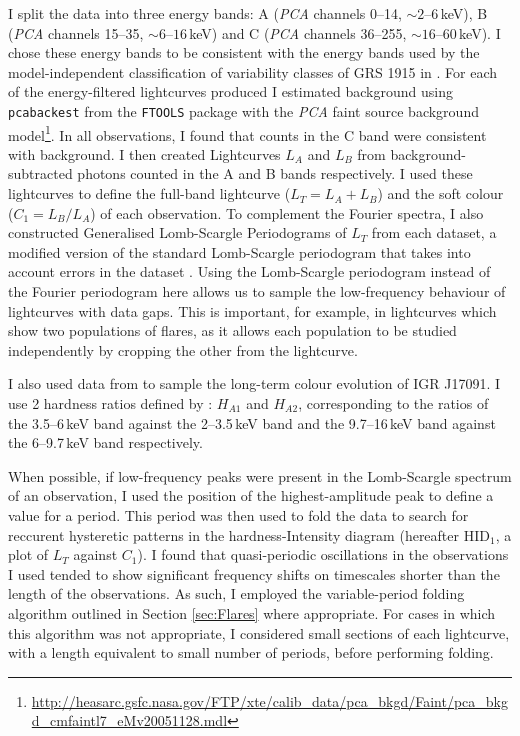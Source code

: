 \par I split the data into three energy bands: A (\textit{PCA} channels 0--14, $\sim2$--$6$\,keV), B (\textit{PCA} channels 15--35, $\sim6$--$16$\,keV) and C (\textit{PCA} channels 36--255, $\sim16$--$60$\,keV).  I chose these energy bands to be consistent with the energy bands used by the model-independent classification of variability classes of GRS 1915 in \citet{Belloni_GRS_MI}.  For each of the energy-filtered lightcurves produced I estimated background using \texttt{pcabackest} from the \texttt{FTOOLS} package \citep{Blackburn_FTools} with the \textit{PCA} faint source background model\footnote{\url{http://heasarc.gsfc.nasa.gov/FTP/xte/calib\_data/pca\_bkgd/Faint/pca\_bkgd\_cmfaintl7\_eMv20051128.mdl}}. In all observations, I found that counts in the C band were consistent with background.  I then created Lightcurves $L_A$ and $L_B$ from background-subtracted photons counted in the A and B bands respectively.  I used these lightcurves to define the full-band lightcurve ($L_T=L_A+L_B$) and the soft colour ($C_1=L_B/L_A$) of each observation.  To complement the Fourier spectra, I also constructed Generalised Lomb-Scargle Periodograms of $L_T$ from each dataset, a modified version of the standard Lomb-Scargle periodogram \citep{Lomb_LombScargle, Scargle_LombScargle} that takes into account errors in the dataset \citep{Irwin_LombScargle}.  Using the Lomb-Scargle periodogram instead of the Fourier periodogram here allows us to sample the low-frequency behaviour of lightcurves with data gaps.  This is important, for example, in lightcurves which show two populations of flares, as it allows each population to be studied independently by cropping the other from the lightcurve.
\par I also used data from \citealt{Altamirano_IGR_FH} to sample the long-term colour evolution of IGR J17091.  I use 2 hardness ratios defined by \citeauthor{Altamirano_IGR_FH}: $H_{A1}$ and $H_{A2}$, corresponding to the ratios of the 3.5--6\,keV band against the 2--3.5\,keV band and the 9.7--16\,keV band against the 6--9.7\,keV band respectively.
\par When possible, if low-frequency peaks were present in the Lomb-Scargle spectrum of an observation, I used the position of the highest-amplitude peak to define a value for a period.  This period was then used to fold the data to search for reccurent hysteretic patterns in the hardness-Intensity diagram (hereafter HID$_1$, a plot of $L_T$ against $C_1$).  I found that quasi-periodic oscillations in the observations I used tended to show significant frequency shifts on timescales shorter than the length of the observations.  As such, I employed the variable-period folding algorithm outlined in Section \ref{sec:Flares} where appropriate.  For cases in which this algorithm was not appropriate, I considered small sections of each lightcurve, with a length equivalent to small number of periods, before performing folding.

